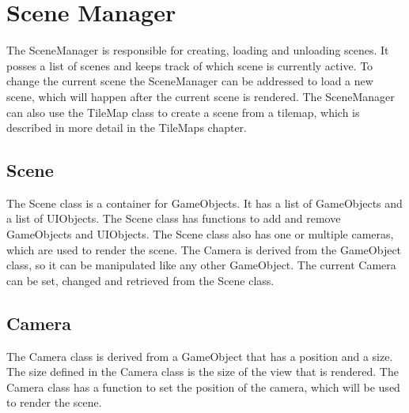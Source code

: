 \section{Scene Manager}
The SceneManager is responsible for creating, loading and unloading scenes.
It posses a list of scenes and keeps track of which scene is currently active.
To change the current scene the SceneManager can be addressed to load a new scene, which will happen after the current scene is rendered.
The SceneManager can also use the TileMap class to create a scene from a tilemap, which is described in more detail in the TileMaps chapter.

\subsection{Scene}
The Scene class is a container for GameObjects.
It has a list of GameObjects and a list of UIObjects.
The Scene class has functions to add and remove GameObjects and UIObjects.
The Scene class also has one or multiple cameras, which are used to render the scene.
The Camera is derived from the GameObject class, so it can be manipulated like any other GameObject.
The current Camera can be set, changed and retrieved from the Scene class.

\subsection{Camera}
The Camera class is derived from a GameObject that has a position and a size.
The size defined in the Camera class is the size of the view that is rendered.
The Camera class has a function to set the position of the camera, which will be used to render the scene.
